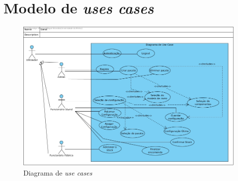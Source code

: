 \section{Modelo de \textit{uses cases}}

\begin{figure}
    \centering
    \includegraphics[width=\textwidth]{analise_de_requisitos/img/use_cases/diagrama_de_use_case.jpg}
    \caption{Diagrama de \textit{use cases}}
    \label{fig:diagrama_de_use_cases}
\end{figure}



